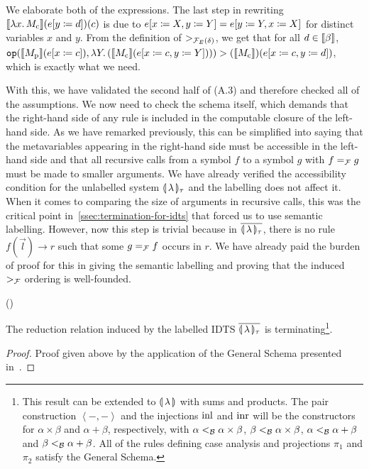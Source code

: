 We elaborate both of the expressions. The last step in rewriting
$\llbracket \lambda x.\, M_{\mathrm{c}} \rrbracket(e[y \coloneqq d])(c)$ is due to
$e[x \coloneqq X, y \coloneqq Y] = e[y \coloneqq Y, x \coloneqq X]$ for distinct variables
$x$ and $y$. From the definition of $>_{\mathcal{F}_E(\delta)}$, we get that for
all $d \in \llbracket \beta \rrbracket$,
$\mathtt{op}(\llbracket M_{\mathrm{p}} \rrbracket(e[x \coloneqq c]),
\lambda Y.\, (\llbracket M_{\mathrm{c}} \rrbracket(e[x \coloneqq c, y \coloneqq Y]))) >
(\llbracket M_{\mathrm{c}} \rrbracket)(e[x \coloneqq c, y \coloneqq d])$, which is exactly what we need.

With this, we have validated the second half of (A.3) and therefore checked
all of the assumptions. We now need to check the schema itself, which
demands that the right-hand side of any rule is included in the computable
closure of the left-hand side. As we have remarked previously, this can be
simplified into saying that the metavariables appearing in the right-hand
side must be accessible in the left-hand side and that all recursive calls
from a symbol $f$ to a symbol $g$ with $f =_{\mathcal{F}} g$ must be made to smaller
arguments. We have already verified the accessibility condition for the
unlabelled system ${\llparenthesis \, \lambda \, \rrparenthesis_\tau}$ and the labelling does not affect it. When it
comes to comparing the size of arguments in recursive calls, this was the
critical point in~\ref{ssec:termination-for-idts} that forced us to use
semantic labelling. However, now this step is trivial because in
${\overline{\llparenthesis \, \lambda \, \rrparenthesis_\tau}}$, there is no rule $f(\vec{l}) \to r$ such that some $g =_{\mathcal{F}} f$
occurs in $r$. We have already paid the burden of proof for this in giving
the semantic labelling and proving that the induced $>_{\mathcal{F}}$ ordering is
well-founded.

\begin{theorem}\label{thm:labidts-termination}
  ()

  The reduction relation induced by the labelled IDTS ${\overline{\llparenthesis \, \lambda \, \rrparenthesis_\tau}}$ is
  terminating\footnote{This result can be extended to $\llparenthesis \, \lambda \, \rrparenthesis$
    with sums and products. The pair construction $\left<-,-\right>$ and
    the injections $\operatorname{inl}$ and $\operatorname{inr}$ will be the constructors for
    $\alpha \times \beta$ and $\alpha + \beta$, respectively, with
    $\alpha <_{\mathcal{B}} \alpha \times \beta$, $\beta <_{\mathcal{B}} \alpha \times \beta$,
    $\alpha <_{\mathcal{B}} \alpha + \beta$ and $\beta <_{\mathcal{B}} \alpha + \beta$. All of
    the rules defining case analysis and projections $\pi_1$ and $\pi_2$
    satisfy the General Schema.}.
\end{theorem}

\begin{proof}
  Proof given above by the application of the General Schema presented
  in~\cite{blanqui2000termination}.
\end{proof}

